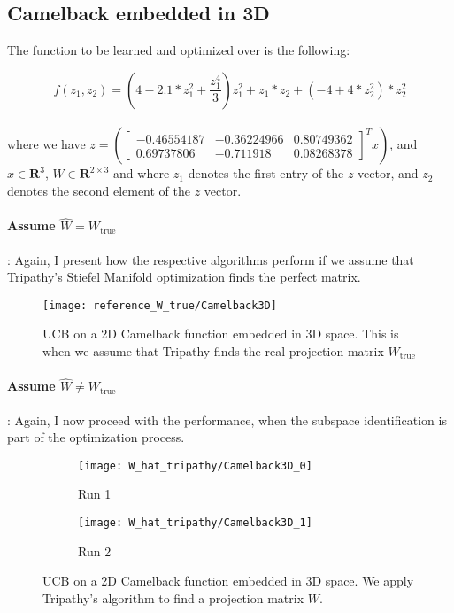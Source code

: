 \subsection{Camelback embedded in 3D}

The function to be learned and optimized over is the following:

\def\WCamelback3D{
\begin{bmatrix}
    -0.46554187 & -0.36224966 & 0.80749362 \\
     0.69737806 & -0.711918 & 0.08268378
\end{bmatrix}}

\begin{equation}
f(z_1, z_2) = \left( 4 - 2.1 * z_1^2 + \frac{z_1^4}{3} \right)  z_1^2 + z_1 *  z_2 + \left(-4 + 4 * z_2^2 \right) * z_2^2
\end{equation} \\

where we have $z = \left( \WCamelback3D^T x \right) $, and $ x \in \mathbf{R}^3$, $W \in \mathbf{R}^{2 \times 3}$ and where $z_1$ denotes the first entry of the $z$ vector, and $z_2$ denotes the second element of the $z$ vector.

\paragraph{Assume $\hat{W} = W_{\text{true}}$}: Again, I present how the respective algorithms perform if we assume that Tripathy's Stiefel Manifold optimization finds the perfect matrix.

\begin{figure}[H]
  \centering
      \texttt{[image: reference\_W\_true/Camelback3D]}
  \caption{UCB on a 2D Camelback function embedded in 3D space.
  This is when we assume that Tripathy finds the real projection matrix $W_{\text{true}}$}
\end{figure}

\paragraph{Assume $\hat{W} \neq W_{\text{true}}$}: Again, I now proceed with the performance, when the subspace identification is part of the optimization process.

\begin{figure}[H]
    \centering
    \begin{subfigure}[b]{0.40\textwidth}
        \texttt{[image: W\_hat\_tripathy/Camelback3D\_0]}
        \label{fig:gull}
        \caption{Run 1}
    \end{subfigure}
    \begin{subfigure}[b]{0.40\textwidth}
        \texttt{[image: W\_hat\_tripathy/Camelback3D\_1]}
        \label{fig:tiger}
        \caption{Run 2}
    \end{subfigure}   
        \caption{UCB on a 2D Camelback function embedded in 3D space.
          We apply Tripathy's algorithm to find a projection matrix $W$.}
\end{figure}

